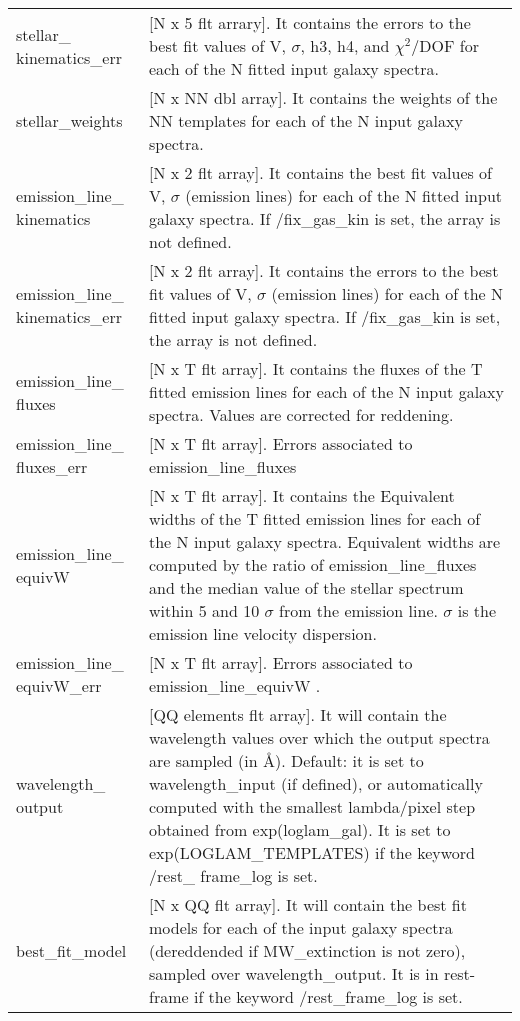 \begin{center}
\begin{longtable}{p{2.7cm}| p{11.1cm}}
  stellar\_ kinematics\_err &[N x 5 flt arrary].  It contains the errors to the best fit values of V, $\sigma$, h3, h4, and $\chi^2$/DOF for each of the N fitted input galaxy spectra.\\
  stellar\_weights        &[N x NN dbl array]. It contains the weights of the NN templates for each of the N input galaxy spectra.\\
  emission\_line\_ kinematics &[N x 2 flt array].  It contains the best fit values of V, $\sigma$ (emission lines) for each of the N fitted
                            input galaxy spectra. If /fix\_gas\_kin is set, the array is not defined.\\
 emission\_line\_ kinematics\_err & [N x 2 flt array].  It contains the errors to the best fit values of V, $\sigma$ (emission lines) for each of the N fitted input galaxy spectra. If /fix\_gas\_kin is set, the array is not defined.\\
 emission\_line\_ fluxes  &[N x T flt array].  It contains the fluxes of the T fitted emission lines for each of the N input galaxy spectra. Values are corrected for reddening.\\
%
 emission\_line\_ fluxes\_err &  [N x T flt array].  Errors associated to emission\_line\_fluxes \\
%
 emission\_line\_ equivW      & [N x T flt array]. It contains the Equivalent widths of the T fitted emission lines for each of the N input galaxy spectra.                            Equivalent widths are computed by the ratio of emission\_line\_fluxes and the median value of the stellar spectrum within 5 and 10 $\sigma$ from the emission line. $\sigma$ is the emission line velocity dispersion. \\
%
 emission\_line\_ equivW\_err  & [N x T flt array]. Errors associated to emission\_line\_equivW  . \\
%
 wavelength\_ output     & [QQ elements flt array]. It will contain the wavelength values over which the output spectra are sampled (in \AA). 
                        Default: it is set to wavelength\_input (if defined), or automatically computed with the smallest lambda/pixel step obtained from exp(loglam\_gal). 
                        It is set to exp(LOGLAM\_TEMPLATES) if the keyword /rest\_ frame\_log is set.\\
%
 best\_fit\_model      &[N x QQ flt array]. It will contain the best fit models for each of the input galaxy spectra (dereddended if 
                       MW\_extinction is not zero), sampled over wavelength\_output. It is in rest-frame if the keyword /rest\_frame\_log is set. \\

\end{longtable}
\end{center}
